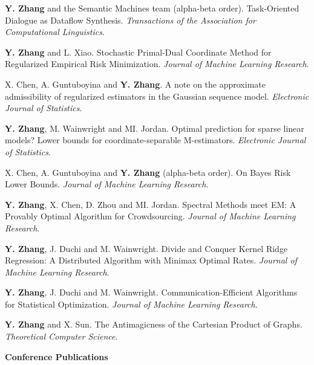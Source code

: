 \documentclass{res}
\begin{document}
\begin{resume}
\begin{enumerate}[label={[J\arabic*]}, ref={J\arabic*}]
\item \textbf{Y. Zhang} and the Semantic Machines team (alpha-beta order). Task-Oriented Dialogue as Dataflow Synthesis.
\emph{Transactions of the Association for Computational Linguistics}.\label{task-tacl}

\item \textbf{Y. Zhang} and L. Xiao. Stochastic Primal-Dual Coordinate Method for Regularized Empirical Risk Minimization.
\emph{Journal of Machine Learning Research}.\label{stochastic-jmlr}

\item X. Chen, A. Guntuboyina and \textbf{Y. Zhang}. A note on the approximate admissibility of regularized estimators in the Gaussian sequence model.
\emph{Electronic Journal of Statistics}.\label{a-note-ejs}

\item \textbf{Y. Zhang}, M. Wainwright and MI. Jordan. Optimal prediction for sparse linear models? Lower bounds for coordinate-separable M-estimators.\label{optimality-ejs}
\emph{Electronic Journal of Statistics}.

\item X. Chen, A. Guntuboyina and \textbf{Y. Zhang} (alpha-beta order). On Bayes Risk Lower Bounds.
\emph{Journal of Machine Learning Research}.\label{on-bayes-jmlr}

\item \textbf{Y. Zhang}, X. Chen, D. Zhou and MI. Jordan. Spectral Methods meet EM: A Provably Optimal Algorithm for Crowdsourcing.
\emph{Journal of Machine Learning Research}.\label{spectral-jmlr}

\item \textbf{Y. Zhang}, J. Duchi and M. Wainwright. Divide and Conquer Kernel Ridge Regression: A Distributed Algorithm with Minimax Optimal Rates.
\emph{Journal of Machine Learning Research}.\label{divide-jmlr}

\item \textbf{Y. Zhang}, J. Duchi and M. Wainwright. Communication-Efficient Algorithms for Statistical Optimization.
\emph{Journal of Machine Learning Research}.\label{communication-jmlr}

\item \textbf{Y. Zhang} and X. Sun. The Antimagicness of the Cartesian Product of Graphs.
\emph{Theoretical Computer Science}.\label{the-antimagicness-tcs}
\end{enumerate}

{\bf\Large Conference Publications}
\vspace{5pt}


\end{resume}
\end{document}
